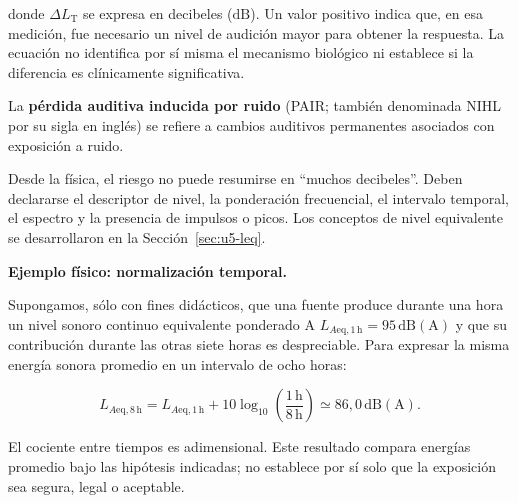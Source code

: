 donde \(\Delta L_{\mathrm{T}}\) se expresa en decibeles (\(\mathrm{dB}\)).
Un valor positivo indica que, en esa medición, fue necesario un nivel de
audición mayor para obtener la respuesta. La ecuación no identifica por sí
misma el mecanismo biológico ni establece si la diferencia es clínicamente
significativa.


La \textbf{pérdida auditiva inducida por ruido} (PAIR; también denominada
NIHL por su sigla en inglés) se refiere a cambios auditivos permanentes
asociados con exposición a ruido. 

Desde la física, el riesgo no puede resumirse en ``muchos decibeles''. Deben
declararse el descriptor de nivel, la ponderación frecuencial, el intervalo
temporal, el espectro y la presencia de impulsos o picos. Los conceptos de
nivel equivalente se desarrollaron en la Sección~\ref{sec:u5-leq}.

\medskip
\noindent\textbf{Ejemplo físico: normalización temporal.}\par
Supongamos, sólo con fines didácticos, que una fuente produce durante una hora
un nivel sonoro continuo equivalente ponderado A
\(L_{A\mathrm{eq},1\,\mathrm{h}}=95\,\mathrm{dB(A)}\) y que su contribución durante las
otras siete horas es despreciable. Para expresar la misma energía sonora
promedio en un intervalo de ocho horas:

\begin{equation}
    L_{A\mathrm{eq},8\,\mathrm{h}}
    =
    L_{A\mathrm{eq},1\,\mathrm{h}}
    +10\log_{10}\left(\frac{1\,\mathrm{h}}{8\,\mathrm{h}}\right)
    \simeq 86{,}0\,\mathrm{dB(A)}.
    \label{eq:u8-leq-ejemplo}
\end{equation}

El cociente entre tiempos es adimensional. Este resultado compara energías
promedio bajo las hipótesis indicadas; no establece por sí solo que la
exposición sea segura, legal o aceptable. 

